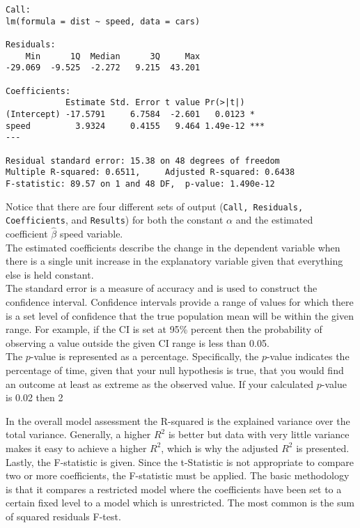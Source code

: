 \documentclass[12pt,a4paper]{article}
\theoremstyle{regla}
\theoremstyle{remark}
\theoremstyle{definition}
\theoremstyle{nonumberbreak}
\begin{document}
\begin{lstlisting}
Call:
lm(formula = dist ~ speed, data = cars)

Residuals:
    Min      1Q  Median      3Q     Max 
-29.069  -9.525  -2.272   9.215  43.201 

Coefficients:
            Estimate Std. Error t value Pr(>|t|)    
(Intercept) -17.5791     6.7584  -2.601   0.0123 *  
speed         3.9324     0.4155   9.464 1.49e-12 ***
---

Residual standard error: 15.38 on 48 degrees of freedom
Multiple R-squared: 0.6511,     Adjusted R-squared: 0.6438 
F-statistic: 89.57 on 1 and 48 DF,  p-value: 1.490e-12 
\end{lstlisting}

Notice that there are four different sets of output (\texttt{Call, Residuals, Coefficients}, and \texttt{Results}) for both the constant $\alpha$ and the estimated coefficient $\hat{\beta}$ speed variable.\\

The estimated coefficients describe the change in the dependent variable when there is a single unit increase in the explanatory variable given that everything else is held constant. \\ 

The standard error is a measure of accuracy and is used to construct the confidence interval.  Confidence intervals provide a range of values for which there is a set level of confidence that the true population mean will be within the given range. For example, if the CI is set at 95\% percent then the probability of observing a value outside the given CI range is less than 0.05.\\

The $p$-value is represented as a percentage.  Specifically, the $p$-value indicates the percentage of time, given that your null hypothesis is true, that you would find an outcome at least as extreme as the observed value. If your calculated $p$-value is 0.02 then 2%

In the overall model assessment the R-squared is the explained variance over the total variance.  Generally, a higher $R^2$ is better but data with very little variance makes it easy to achieve a higher $R^2$, which is why the adjusted $R^2$ is presented.\\  

Lastly, the F-statistic is given.  Since the t-Statistic is not appropriate to compare two or more coefficients, the F-statistic must be applied.  The basic methodology is that it compares a restricted model where the coefficients have been set to a certain fixed level to a model which is unrestricted.  The most common is the sum of squared residuals F-test.
\end{document}
